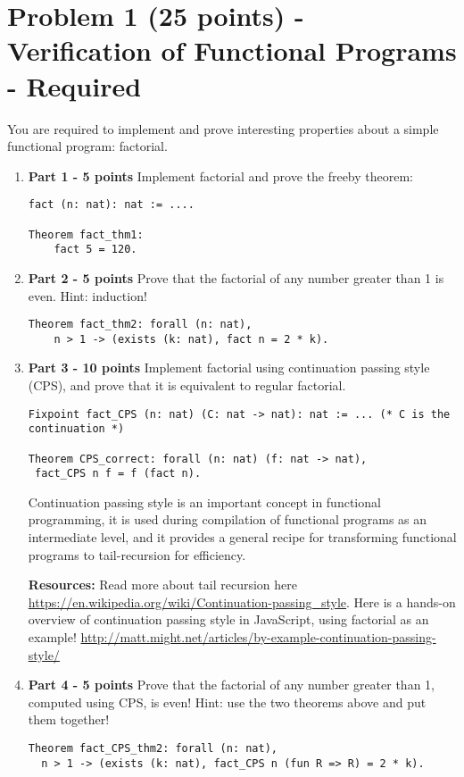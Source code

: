 \documentclass{article}
\begin{document}
\section{Problem 1 (25 points) - Verification of Functional Programs - Required}
You are required to implement and prove interesting properties about a simple functional program: factorial.
\begin{enumerate}
\item \textbf{Part 1 - 5 points} Implement factorial and prove the freeby theorem:
\begin{verbatim}
fact (n: nat): nat := ....

Theorem fact_thm1:
    fact 5 = 120.
\end{verbatim}

\item \textbf{Part 2 - 5 points} Prove that the factorial of any number greater than 1 is even. Hint: induction!
\begin{verbatim}
Theorem fact_thm2: forall (n: nat),
    n > 1 -> (exists (k: nat), fact n = 2 * k).
\end{verbatim}

\item \textbf{Part 3 - 10 points} Implement factorial using continuation passing style (CPS), and prove that it is equivalent to regular factorial.

\begin{verbatim}
Fixpoint fact_CPS (n: nat) (C: nat -> nat): nat := ... (* C is the continuation *)

Theorem CPS_correct: forall (n: nat) (f: nat -> nat),
 fact_CPS n f = f (fact n).
\end{verbatim}

Continuation passing style is an important concept in functional programming, it is used during compilation of functional programs as an intermediate level, and it provides a general recipe
for transforming functional programs to tail-recursion for efficiency. 

\textbf{Resources:} Read more about tail recursion here \href{https://en.wikipedia.org/wiki/Continuation-passing\_style}{https://en.wikipedia.org/wiki/Continuation-passing\_style}.
Here is a hands-on overview of continuation passing style in JavaScript, using factorial as an example! \href{http://matt.might.net/articles/by-example-continuation-passing-style/}{http://matt.might.net/articles/by-example-continuation-passing-style/}

\item \textbf{Part 4 - 5 points} Prove that the factorial of any number greater than 1, computed using CPS, is even! Hint: use the two theorems above and put them together!
\begin{verbatim}
Theorem fact_CPS_thm2: forall (n: nat),
  n > 1 -> (exists (k: nat), fact_CPS n (fun R => R) = 2 * k).
\end{verbatim}
\end{enumerate}
\end{document}
